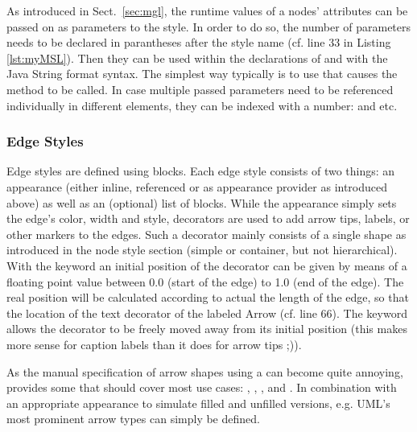 \documentclass[a4paper,american,12pt]{scrreprt}
\begin{document}
As introduced in Sect.~\ref{sec:mgl}, the runtime values of a nodes' attributes
can be passed on as parameters to the style. In order to do so, the number of parameters
needs to be declared in parantheses after the style name (cf. line 33 in
Listing \ref{lst:myMSL}). Then they can be used within the  declarations
of  and  with the Java String format
syntax\footnotemark{}. The simplest way typically is to use  that
causes the  method to be called. In case multiple passed
parameters need to be referenced individually in different  elements,
they can be indexed with a number:  and  etc.
%
%


\subsubsection{Edge Styles}

Edge styles are defined using   blocks. Each edge
style consists of two things: an appearance (either inline, referenced or as
appearance provider as introduced above) as well as an (optional) list of 
 blocks. While the appearance simply sets the edge's color, width
and style, decorators are used to add arrow tips, labels, or other markers to
the edges. Such a decorator mainly consists of a single shape as introduced in
the node style section (simple or container, but not hierarchical). With the
keyword  an initial position of the decorator can be given by means
of a floating point value between 0.0 (start of the edge) to 1.0 (end of the
edge). The real position will be calculated according to actual the length of
the edge, so that the location of the text decorator of the labeled Arrow (cf.
line 66). The keyword  allows the decorator to be freely moved away
from its initial position (this makes more sense for caption labels than it does
for arrow tips ;)). 

As the manual specification of arrow shapes using a  can become
quite annoying, \cinco{} provides some  that
should cover most use cases: , , , and
. In combination with an appropriate appearance to simulate filled
and unfilled versions, e.g. UML's most prominent arrow types can simply be
defined.
\end{document}
